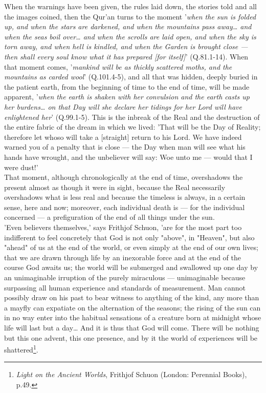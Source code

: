 \documentclass[11pt, b5paper, twoside]{book}
\begin{document}
When the warnings have been given, the rules laid down, the stories told and all the images coined, 
then the Qur'an turns to the moment '\emph{when the sun is folded up, and when the stars are darkened, and when the mountains pass away\ldots{} and when the seas boil over\ldots{} and when the scrolls are laid open, and when the sky is torn away, and when hell is kindled, and when the Garden is brought close --- then shall every soul know what it has prepared [for itself]}' (Q.81.1-14). When that moment comes, '\emph{mankind will be as thickly scattered moths, and the mountains as carded wool}' (Q.101.4-5), and all that was hidden, deeply buried in the patient earth, from the beginning of time to the end of time, will be made apparent, '\emph{when the earth is shaken with her convulsion and the earth casts up her burdens\ldots{} on that Day will she declare her tidings for her Lord will have enlightened her}' (Q.99.1-5). This is the inbreak of the Real and the destruction of the entire fabric of the dream in which we lived: 'That will be the Day of Reality; therefore let whoso will take a [straight] return to his Lord. We 
have indeed warned you of a penalty that is close --- the Day when man will see what his hands have 
wrought, and the unbeliever will say: Woe unto me --- would that I were dust!' \\

That moment, although chronologically at the end of time, overshadows the present almost as though it 
were in sight, because the Real necessarily overshadows what is less real and because the timeless is 
always, in a certain sense, here and now; moreover, each individual death is --- for the individual 
concerned --- a prefiguration of the end of all things under the sun. \\

'Even believers themselves,' says Frithjof Schuon, 'are for the most part too indifferent to feel 
concretely that God is not only "above", in "Heaven", but also "ahead" of us at the end of the world, 
or even simply at the end of our own lives; that we are drawn through life by an inexorable force and 
at the end of the course God awaits us; the world will be submerged and swallowed up one day by an 
unimaginable irruption of the purely miraculous --- unimaginable because surpassing all human 
experience and standards of measurement. Man cannot possibly draw on his past to bear witness to 
anything of the kind, any more than a mayfly can expatiate on the alternation of the seasons; the 
rising of the sun can in no way enter into the habitual sensations of a creature born at midnight 
whose life will last but a day\ldots{} And it is thus that God will come. There will be nothing but this 
one advent, this one presence, and by it the world of experiences will be shattered\footnote{\emph{Light on the Ancient Worlds}, Frithjof Schuon (London: Perennial Books), p.49.}. \\
\end{document}
